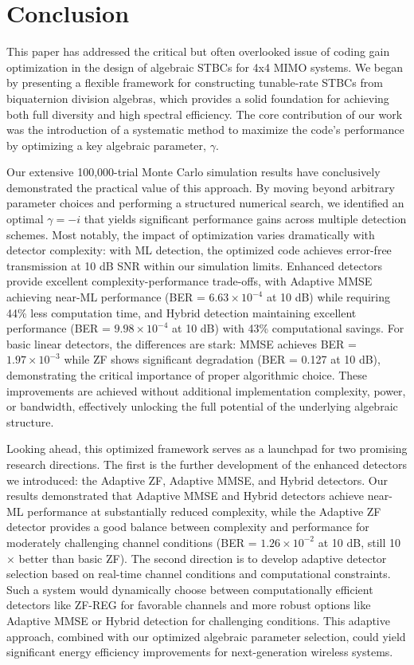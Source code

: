 \section{Conclusion}
This paper has addressed the critical but often overlooked issue of coding gain optimization in the design of algebraic STBCs for 4x4 MIMO systems. We began by presenting a flexible framework for constructing tunable-rate STBCs from biquaternion division algebras, which provides a solid foundation for achieving both full diversity and high spectral efficiency. The core contribution of our work was the introduction of a systematic method to maximize the code's performance by optimizing a key algebraic parameter, \(\gamma\).

Our extensive 100,000-trial Monte Carlo simulation results have conclusively demonstrated the practical value of this approach. By moving beyond arbitrary parameter choices and performing a structured numerical search, we identified an optimal \(\gamma = -i\) that yields significant performance gains across multiple detection schemes. Most notably, the impact of optimization varies dramatically with detector complexity: with ML detection, the optimized code achieves error-free transmission at 10 dB SNR within our simulation limits. Enhanced detectors provide excellent complexity-performance trade-offs, with Adaptive MMSE achieving near-ML performance (BER = $6.63 \times 10^{-4}$ at 10 dB) while requiring 44\% less computation time, and Hybrid detection maintaining excellent performance (BER = $9.98 \times 10^{-4}$ at 10 dB) with 43\% computational savings. For basic linear detectors, the differences are stark: MMSE achieves BER = $1.97 \times 10^{-3}$ while ZF shows significant degradation (BER = 0.127 at 10 dB), demonstrating the critical importance of proper algorithmic choice. These improvements are achieved without additional implementation complexity, power, or bandwidth, effectively unlocking the full potential of the underlying algebraic structure.

Looking ahead, this optimized framework serves as a launchpad for two promising research directions. The first is the further development of the enhanced detectors we introduced: the Adaptive ZF, Adaptive MMSE, and Hybrid detectors. Our results demonstrated that Adaptive MMSE and Hybrid detectors achieve near-ML performance at substantially reduced complexity, while the Adaptive ZF detector provides a good balance between complexity and performance for moderately challenging channel conditions (BER = $1.26 \times 10^{-2}$ at 10 dB, still 10$\times$ better than basic ZF). The second direction is to develop adaptive detector selection based on real-time channel conditions and computational constraints. Such a system would dynamically choose between computationally efficient detectors like ZF-REG for favorable channels and more robust options like Adaptive MMSE or Hybrid detection for challenging conditions. This adaptive approach, combined with our optimized algebraic parameter selection, could yield significant energy efficiency improvements for next-generation wireless systems.
